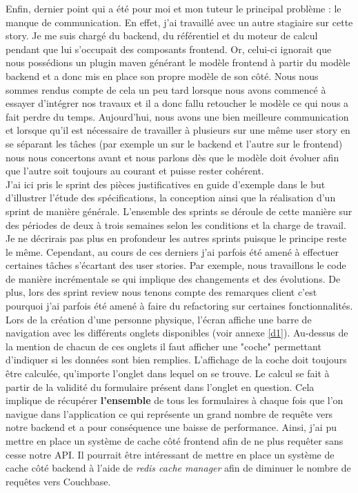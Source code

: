 	Enfin, dernier point qui a été pour moi et mon tuteur le principal problème : le manque de communication. En effet, j'ai travaillé avec un autre stagiaire sur cette story. Je me suis chargé du backend, du référentiel et du moteur de calcul pendant que lui s'occupait des composants frontend. Or, celui-ci ignorait que nous possédions un plugin maven générant le modèle frontend à partir du modèle backend et a donc mis en place son propre modèle de son côté. Nous nous sommes rendus compte de cela un peu tard lorsque nous avons commencé à essayer d'intégrer nos travaux et il a donc fallu retoucher le modèle ce qui nous a fait perdre du temps. Aujourd'hui, nous avons une bien meilleure communication et lorsque qu'il est nécessaire de travailler à plusieurs sur une même user story en se séparant les tâches (par exemple un sur le backend et l'autre sur le frontend) nous nous concertons avant et nous parlons dès que le modèle doit évoluer afin que l'autre soit toujours au courant et puisse rester cohérent. \\

	J'ai ici pris le sprint des pièces justificatives en guide d'exemple dans le but d'illustrer l'étude des spécifications, la conception ainsi que la réalisation d'un sprint de manière générale. L'ensemble des sprints se déroule de cette manière sur des périodes de deux à trois semaines selon les conditions et la charge de travail. Je ne décrirais pas plus en profondeur les autres sprints puisque le principe reste le même. Cependant, au cours de ces derniers j'ai parfois été amené à effectuer certaines tâches s'écartant des user stories. Par exemple, nous travaillons le code de manière incrémentale se qui implique des changements et des évolutions. De plus, lors des sprint review nous tenons compte des remarques client c'est pourquoi j'ai parfois été amené à faire du refactoring sur certaines fonctionnalités. \\
	
	Lors de la création d'une personne physique, l'écran affiche une barre de navigation avec les différents onglets disponibles (voir annexe \ref{d1}). Au-dessus de la mention de chacun de ces onglets il faut afficher une "coche" permettant d'indiquer si les données sont bien remplies. L'affichage de la coche doit toujours être calculée, qu'importe l'onglet dans lequel on se trouve. Le calcul se fait à partir de la validité du formulaire présent dans l'onglet en question. Cela implique de récupérer \textbf{l'ensemble} de tous les formulaires à chaque fois que l'on navigue dans l'application ce qui représente un grand nombre de requête vers notre backend et a pour conséquence une baisse de performance. Ainsi, j'ai pu mettre en place un système de cache côté frontend afin de ne plus requêter sans cesse notre API. Il pourrait être intéressant de mettre en place un système de cache côté backend à l'aide de \textit{redis cache manager} afin de diminuer le nombre de requêtes vers Couchbase. \\
	
